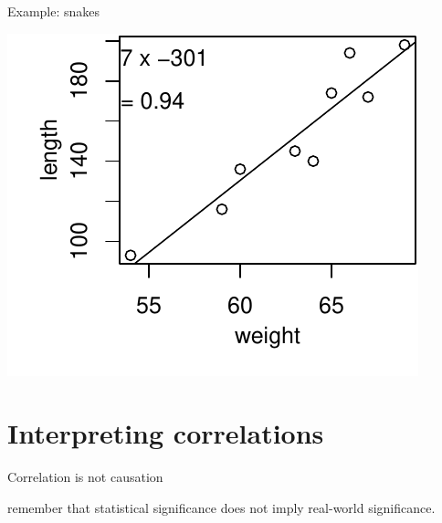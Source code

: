 \begin{frame}{Example: snakes}

  \begin{center}
  \end{center}

\end{frame}

\begin{frame}
  \begin{center}
    \includegraphics[width=\textwidth]{snakes-cor-ex}
  \end{center}
\end{frame}

\section{Interpreting correlations}

\begin{frame}{Correlation is not causation}

  \begin{center}
  \end{center}


    \vspace{2em}

     remember that statistical significance \alert{does not imply real-world significance}.


\end{frame}


